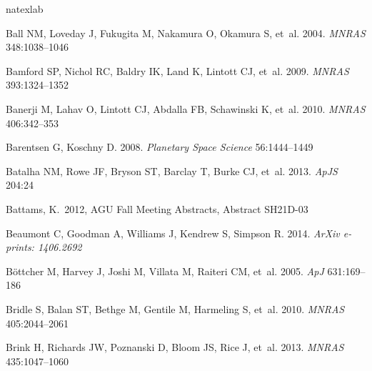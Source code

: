 \documentclass{ar2e}
\def\apj{ApJ}
\def\apjs{ApJS}
\def\mnras{MNRAS}
\def\planss{Planetary Space Science}
\begin{document}
\begin{thebibliography}{}
\expandafter\ifx\csname natexlab\endcsname\relax\def\natexlab#1{#1}\fi

{Ball} NM, {Loveday} J, {Fukugita} M, {Nakamura} O, {Okamura} S, et~al. 2004.
\newblock \textit{\mnras} 348:1038--1046

{Bamford} SP, {Nichol} RC, {Baldry} IK, {Land} K, {Lintott} CJ, et~al. 2009.
\newblock \textit{\mnras} 393:1324--1352

{Banerji} M, {Lahav} O, {Lintott} CJ, {Abdalla} FB, {Schawinski} K, et~al.
  2010.
\newblock \textit{\mnras} 406:342--353

{Barentsen} G, {Koschny} D. 2008.
\newblock \textit{\planss} 56:1444--1449

{Batalha} NM, {Rowe} JF, {Bryson} ST, {Barclay} T, {Burke} CJ, et~al. 2013.
\newblock \textit{\apjs} 204:24

 Battams, K.\ 2012, AGU Fall 
Meeting Abstracts, Abstract SH21D-03

{Beaumont} C, {Goodman} A, {Williams} J, {Kendrew} S, {Simpson} R. 2014.
\newblock \textit{ArXiv e-prints: 1406.2692}

{B{\"o}ttcher} M, {Harvey} J, {Joshi} M, {Villata} M, {Raiteri} CM, et~al.
  2005.
\newblock \textit{\apj} 631:169--186

{Bridle} S, {Balan} ST, {Bethge} M, {Gentile} M, {Harmeling} S, et~al. 2010.
\newblock \textit{\mnras} 405:2044--2061

{Brink} H, {Richards} JW, {Poznanski} D, {Bloom} JS, {Rice} J, et~al. 2013.
\newblock \textit{\mnras} 435:1047--1060


\end{thebibliography}
\end{document}
